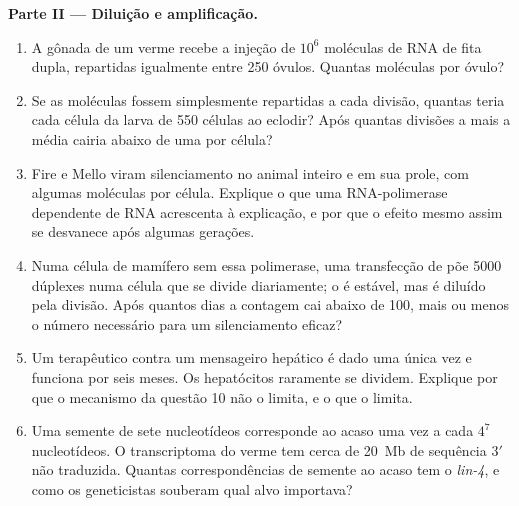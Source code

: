 \begin{problem}
\medskip
\noindent\textbf{Parte II --- Diluição e amplificação.}
\begin{enumerate}[resume]
  \item A gônada de um verme recebe a injeção de $10^{6}$ moléculas de
        RNA de fita dupla, repartidas igualmente entre \num{250}
        óvulos. Quantas moléculas por óvulo?
  \item Se as moléculas fossem simplesmente repartidas a cada divisão,
        quantas teria cada célula da larva de \num{550} células ao
        eclodir? Após quantas divisões a mais a média cairia abaixo de
        uma por célula?
  \item Fire e Mello viram silenciamento no animal inteiro e em sua
        prole, com algumas moléculas por célula. Explique o que uma
        RNA-polimerase dependente de RNA acrescenta à explicação, e
        por que o efeito mesmo assim se desvanece após algumas
        gerações.
  \item Numa célula de mamífero sem essa polimerase, uma transfecção
        de  põe \num{5000} dúplexes numa célula que se divide
        diariamente; o  é estável, mas é diluído pela divisão.
        Após quantos dias a contagem cai abaixo de \num{100}, mais ou
        menos o número necessário para um silenciamento eficaz?
  \item Um  terapêutico contra um mensageiro hepático é dado uma
        única vez e funciona por seis meses. Os hepatócitos raramente
        se dividem. Explique por que o mecanismo da questão 10 não o
        limita, e o que o limita.
  \item Uma semente de sete nucleotídeos corresponde ao acaso uma vez
        a cada $4^{7}$ nucleotídeos. O transcriptoma do verme tem
        cerca de \qty{20}{Mb} de sequência 3$'$ não traduzida. Quantas
        correspondências de semente ao acaso tem o \emph{lin-4}, e
        como os geneticistas souberam qual alvo importava?
\end{enumerate}


\end{problem}
